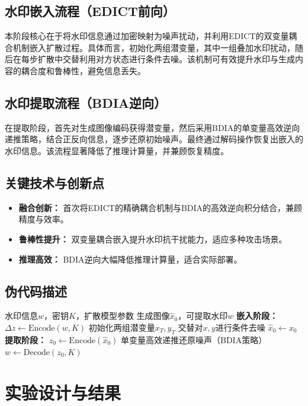 \documentclass[conference]{IEEEtran}
\begin{document}
\subsection{水印嵌入流程（EDICT前向）}
本阶段核心在于将水印信息通过加密映射为噪声扰动，并利用EDICT的双变量耦合机制嵌入扩散过程。具体而言，初始化两组潜变量，其中一组叠加水印扰动，随后在每步扩散中交替利用对方状态进行条件去噪。该机制可有效提升水印与生成内容的耦合度和鲁棒性，避免信息丢失。

\subsection{水印提取流程（BDIA逆向）}
在提取阶段，首先对生成图像编码获得潜变量，然后采用BDIA的单变量高效逆向递推策略，结合正反向信息，逐步还原初始噪声。最终通过解码操作恢复出嵌入的水印信息。该流程显著降低了推理计算量，并兼顾恢复精度。

\subsection{关键技术与创新点}
\begin{itemize}
    \item \textbf{融合创新：} 首次将EDICT的精确耦合机制与BDIA的高效逆向积分结合，兼顾精度与效率。
    \item \textbf{鲁棒性提升：} 双变量耦合嵌入提升水印抗干扰能力，适应多种攻击场景。
    \item \textbf{推理高效：} BDIA逆向大幅降低推理计算量，适合实际部署。
\end{itemize}

\subsection{伪代码描述}
\begin{algorithmic}[1]
\REQUIRE 水印信息$w$，密钥$K$，扩散模型参数
\ENSURE 生成图像$\hat{x}_0$，可提取水印$w$
\STATE \textbf{嵌入阶段：}
    \STATE $\Delta z \leftarrow \text{Encode}(w, K)$
    \STATE 初始化两组潜变量$x_T, y_T$
        \STATE 交替对$x, y$进行条件去噪
    \ENDFOR
    \STATE $\hat{x}_0 \leftarrow x_0$
\STATE \textbf{提取阶段：}
    \STATE $z_0 \leftarrow \text{Encode}(\hat{x}_0)$
        \STATE 单变量高效递推还原噪声（BDIA策略）
    \ENDFOR
    \STATE $w \leftarrow \text{Decode}(z_0, K)$
\end{algorithmic}

\section{实验设计与结果}
\end{document}
